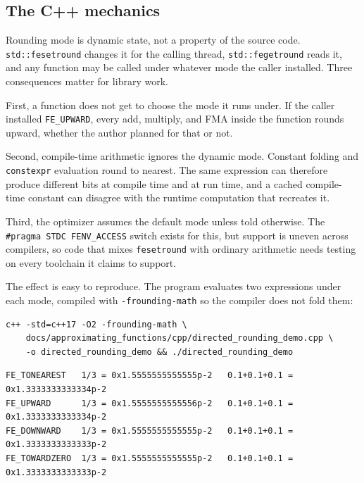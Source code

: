 \documentclass[manuscript, nonacm]{acmart}
\begin{document}
    \subsection{The C++ mechanics}

    Rounding mode is dynamic state, not a property of the source code.
    \texttt{std::fesetround} changes it for the calling thread,
    \texttt{std::fegetround} reads it, and any function may be called under
    whatever mode the caller installed. Three consequences matter for
    library work.

    First, a function does not get to choose the mode it runs under. If the
    caller installed \texttt{FE\_UPWARD}, every add, multiply, and FMA inside
    the function rounds upward, whether the author planned for that or not.

    Second, compile-time arithmetic ignores the dynamic mode. Constant
    folding and \texttt{constexpr} evaluation round to nearest. The same
    expression can therefore produce different bits at compile time and at
    run time, and a cached compile-time constant can disagree with the
    runtime computation that recreates it.

    Third, the optimizer assumes the default mode unless told otherwise. The
    \texttt{\#pragma STDC FENV\_ACCESS} switch exists for this, but support
    is uneven across compilers, so code that mixes \texttt{fesetround} with
    ordinary arithmetic needs testing on every toolchain it claims to
    support.

    The effect is easy to reproduce. The program
    evaluates two expressions under each mode, compiled with
    \texttt{-frounding-math} so the compiler does not fold them:
    \begin{lstlisting}[style=shell]
c++ -std=c++17 -O2 -frounding-math \
    docs/approximating_functions/cpp/directed_rounding_demo.cpp \
    -o directed_rounding_demo && ./directed_rounding_demo
    \end{lstlisting}

    \begin{lstlisting}[style=output]
FE_TONEAREST   1/3 = 0x1.5555555555555p-2   0.1+0.1+0.1 = 0x1.3333333333334p-2
FE_UPWARD      1/3 = 0x1.5555555555556p-2   0.1+0.1+0.1 = 0x1.3333333333334p-2
FE_DOWNWARD    1/3 = 0x1.5555555555555p-2   0.1+0.1+0.1 = 0x1.3333333333333p-2
FE_TOWARDZERO  1/3 = 0x1.5555555555555p-2   0.1+0.1+0.1 = 0x1.3333333333333p-2
    \end{lstlisting}
\end{document}
